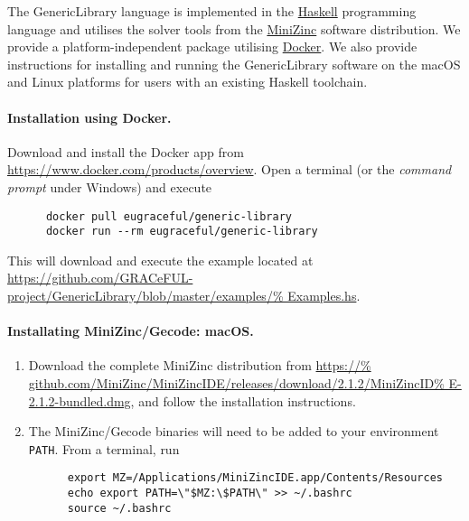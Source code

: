 
The GenericLibrary language is implemented in the 
\href{https://www.haskell.org/}{Haskell} programming language and utilises the 
solver tools from the \href{http://www.minizinc.org/}{MiniZinc} software
distribution. We provide a platform-independent package utilising 
\href{https://www.docker.com/}{Docker}. We also provide instructions for 
installing and running the GenericLibrary software on the macOS and Linux 
platforms for users with an existing Haskell toolchain.


\paragraph{Installation using Docker.} Download and install the Docker app from
\url{https://www.docker.com/products/overview}. Open a terminal (or the 
\emph{command prompt} under Windows) and execute 

    \begin{verbatim}
      docker pull eugraceful/generic-library
      docker run --rm eugraceful/generic-library
    \end{verbatim}

This will download and execute the example located at
\url{https://github.com/GRACeFUL-project/GenericLibrary/blob/master/examples/%
Examples.hs}.


\paragraph{Installating MiniZinc/Gecode: macOS.} 

\begin{enumerate}
  \item Download the complete MiniZinc distribution from \url{https://%
    github.com/MiniZinc/MiniZincIDE/releases/download/2.1.2/MiniZincID%
    E-2.1.2-bundled.dmg}, and follow the installation instructions.
  \item The MiniZinc/Gecode binaries will need to be added to your environment 
    \verb+PATH+. From a terminal, run

    \begin{verbatim}
      export MZ=/Applications/MiniZincIDE.app/Contents/Resources
      echo export PATH=\"$MZ:\$PATH\" >> ~/.bashrc
      source ~/.bashrc
    \end{verbatim}
\end{enumerate}

